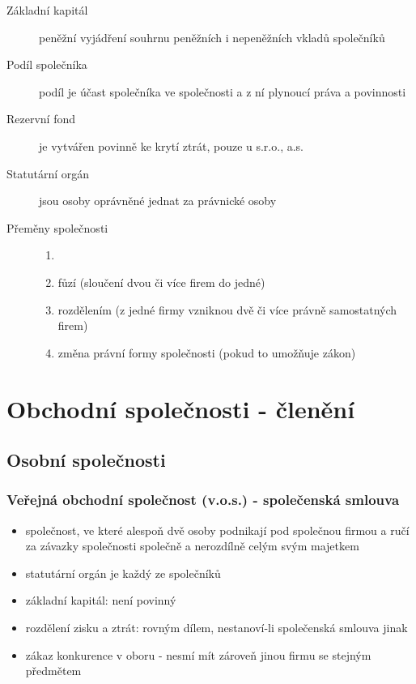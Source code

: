 \begin{description}
    \item[Základní kapitál] peněžní vyjádření souhrnu peněžních i nepeněžních vkladů společníků
    \item[Podíl společníka] podíl je účast společníka ve společnosti a z ní plynoucí práva a povinnosti
    \item[Rezervní fond] je vytvářen povinně ke krytí ztrát, pouze u s.r.o., a.s.
    \item[Statutární orgán] jsou osoby oprávněné jednat za právnické osoby
    \item[Přeměny společnosti]
        \begin{enumerate}[label=(\alph*)]
            \item []
            \item fůzí (sloučení dvou či více firem do jedné)
            \item rozdělením (z jedné firmy vzniknou dvě či více právně samostatných firem)
            \item změna právní formy společnosti (pokud to umožňuje zákon)	
        \end{enumerate}
\end{description}

\section{Obchodní společnosti - členění}
    \subsection{Osobní společnosti}
        \subsubsection{Veřejná obchodní společnost (v.o.s.) - společenská smlouva}
            \begin{itemize}
                \item společnost, ve které alespoň dvě osoby podnikají pod společnou firmou a ručí za závazky společnosti společně a nerozdílně celým svým majetkem
                \item statutární orgán je každý ze společníků
                \item základní kapitál: není povinný
                \item rozdělení zisku a ztrát: rovným dílem, nestanoví-li společenská smlouva jinak
                \item zákaz konkurence v oboru - nesmí mít zároveň jinou firmu se stejným předmětem
            \end{itemize}
